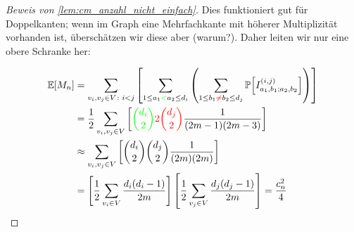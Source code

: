 \begin{proof}[Beweis von \cref{lem:cm_anzahl_nicht_einfach}]
    Dies funktioniert gut für Doppelkanten; wenn im Graph eine Mehrfachkante mit höherer Multiplizität vorhanden ist, überschätzen wir diese aber (warum?).
    Daher leiten wir nur eine obere Schranke her:

    \begin{align}
        \mathbb{E}\!\left[M_n\right]
         & = \sum_{v_i, v_j \in V\colon i < j} \left[ \sum_{1 \le a_1 \textcolor{green}{<} a_2 \le d_i} \left( \sum_{1 \le b_1 \textcolor{red}{\ne} b_2 \le d_j} \mathbb{P}\!\left[I^{(i,j)}_{a_1,b_1;a_2,b_2}\right] \right) \right] \\
         & = \frac 1 2 \sum_{v_i, v_j \in V} \left[ \textcolor{green}{\binom{d_i}{2}} \textcolor{red}{2\binom{d_j}{2}} \frac{1}{(2m - 1)(2m - 3)}   \right]                                                         \\
         & \approx \sum_{v_i, v_j \in V} \left[ \binom{d_i}{2} \binom{d_j}{2} \frac{1}{(2m)(2m)}   \right]                                                                                                          \\
         & = \left[ \frac{1}{2} \sum_{v_i \in V} \frac{d_i (d_i - 1)}{2m}  \right] \left[ \frac{1}{2} \sum_{v_j \in V} \frac{d_j (d_j - 1)}{2m} \right]
        = \frac{c_n^2}{4} \qedhere
    \end{align}
\end{proof}

